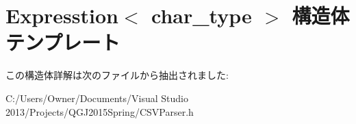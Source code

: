 \hypertarget{struct_expresstion}{}\section{Expresstion$<$ char\+\_\+type $>$ 構造体テンプレート}
\label{struct_expresstion}


この構造体詳解は次のファイルから抽出されました\+:\begin{DoxyCompactItemize}
\item 
C\+:/\+Users/\+Owner/\+Documents/\+Visual Studio 2013/\+Projects/\+Q\+G\+J2015\+Spring/C\+S\+V\+Parser.\+h\end{DoxyCompactItemize}
